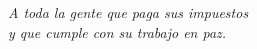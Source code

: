 \thispagestyle{empty}
\vspace*{8cm}
\begin{flushright}
\textit{A toda la gente que paga sus impuestos\\
y que cumple con su trabajo en paz.}
\end{flushright}                 

